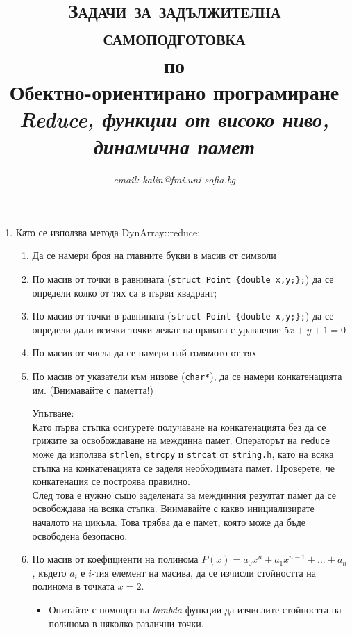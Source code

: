 \documentclass[12pt,a4paper]{article}
\author{\textit{email: kalin@fmi.uni-sofia.bg}}
\title{\textsc{Задачи за задължителна самоподготовка} \\
по \\
Обектно-ориентирано програмиране\\
\textit{Reduce, функции от високо ниво, динамична памет}}
\begin{document}
\maketitle


\begin{enumerate}

	\item Като се използва метода DynArray::reduce:

		\begin{enumerate}
			\item Да се намери броя на главните букви в масив от символи
			\item По масив от точки в равнината (\texttt{struct Point \{double x,y;\};}) да се определи колко от тях са в първи квадрант;
			\item По масив от точки в равнината (\texttt{struct Point \{double x,y;\};}) да се определи дали всички точки лежат на правата с уравнение $5x + y + 1 = 0$
			\item По масив от числа да се намери най-голямото от тях
			\item По масив от указатели към низове (\texttt{char*}), да се намери конкатенацията им. (Внимавайте с паметта!)
			\begin{mdframed}[hidealllines=true,backgroundcolor=gray!20]
			Упътване:\\
			
			Като първа стъпка осигурете получаване на конкатенацията без да се грижите за освобождаване на междинна памет. Операторът на \texttt{reduce} може да използва \texttt{strlen}, \texttt{strcpy} и \texttt{strcat} от \texttt{string.h}, като на всяка стъпка на конкатенацията се заделя необходимата памет. Проверете, че конкатенация се построява правилно.\\

			След това е нужно също заделената за междинния резултат памет да се освобождава на всяка стъпка. Внимавайте с какво инициализирате началото на цикъла. Това трябва да е памет, която може да бъде освободена безопасно.
			\end{mdframed}
			\item По масив от коефициенти на полинома $P(x)=a_0x^n + a_1x^{n-1} + ...+ a_n$, където $a_i$ е $i$-тия елемент на масива, да се изчисли стойността на полинома в точката $x=2$. 
			\begin{itemize}
				\item Опитайте с помощта на \textit{lambda} функции да изчислите стойността на полинома в няколко различни точки.
			\end{itemize}
			

\end{enumerate}
\end{enumerate}
\end{document}
